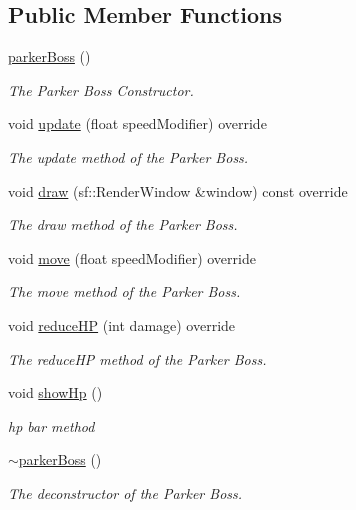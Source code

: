 \subsection*{Public Member Functions}
\begin{DoxyCompactItemize}
\item 
\hyperlink{classparker_boss_a1d5b19e3e4a6d0cbbfc599342ad70312}{parker\+Boss} ()
\begin{DoxyCompactList}\small\item\em The Parker Boss Constructor. \end{DoxyCompactList}\item 
void \hyperlink{classparker_boss_a5f82194f8880924981fccd4bf611f324}{update} (float speed\+Modifier) override
\begin{DoxyCompactList}\small\item\em The update method of the Parker Boss. \end{DoxyCompactList}\item 
void \hyperlink{classparker_boss_a58e7adcdd65c22eeaff3ef4185722417}{draw} (sf\+::\+Render\+Window \&window) const override
\begin{DoxyCompactList}\small\item\em The draw method of the Parker Boss. \end{DoxyCompactList}\item 
void \hyperlink{classparker_boss_a92a6a7944dcd26818dcfee1701e4a41b}{move} (float speed\+Modifier) override
\begin{DoxyCompactList}\small\item\em The move method of the Parker Boss. \end{DoxyCompactList}\item 
void \hyperlink{classparker_boss_a8ada14e4fa55fe77c905ed28f07c650e}{reduce\+H\+P} (int damage) override
\begin{DoxyCompactList}\small\item\em The reduce\+H\+P method of the Parker Boss. \end{DoxyCompactList}\item 
void \hyperlink{classparker_boss_a52928b2641e7da080fd27b2f9679aa26}{show\+Hp} ()
\begin{DoxyCompactList}\small\item\em hp bar method \end{DoxyCompactList}\item 
\hyperlink{classparker_boss_a73086045e2a5ebbd5e4827bdf19fe77d}{$\sim$parker\+Boss} ()
\begin{DoxyCompactList}\small\item\em The deconstructor of the Parker Boss. \end{DoxyCompactList}\end{DoxyCompactItemize}
